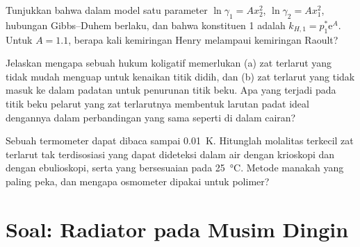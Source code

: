 \begin{exercise}[$\star\star\star$]\label{exo:b2:chemical-potential:10}
Tunjukkan bahwa dalam model satu parameter $\ln\gamma_1 = Ax_2^2$,
$\ln\gamma_2 =
Ax_1^2$, hubungan Gibbs--Duhem berlaku, dan bahwa  konstituen 1 adalah $k_{H,1} = p_1^*\mathrm e^A$. Untuk $A = 1.1$,
berapa kali kemiringan Henry melampaui kemiringan Raoult?
\end{exercise}

\begin{exercise}[$\star\star\star$]\label{exo:b2:chemical-potential:11}
Jelaskan mengapa sebuah hukum koligatif memerlukan (a) zat terlarut yang
tidak mudah menguap untuk kenaikan titik didih, dan (b) zat terlarut yang
tidak masuk ke dalam padatan untuk penurunan titik beku. Apa yang terjadi
pada titik beku pelarut yang zat terlarutnya membentuk larutan padat ideal
dengannya dalam perbandingan yang sama seperti di dalam cairan?
\end{exercise}

\begin{exercise}[$\star\star\star$]\label{exo:b2:chemical-potential:12}
Sebuah termometer dapat dibaca sampai \qty{0.01}{K}. Hitunglah molalitas
terkecil zat terlarut tak terdisosiasi yang dapat dideteksi dalam air
dengan krioskopi dan dengan ebulioskopi, serta  yang
bersesuaian pada \qty{25}{\celsius}. Metode manakah yang paling peka, dan
mengapa osmometer dipakai untuk polimer?
\end{exercise}

\section{Soal: Radiator pada Musim Dingin}

